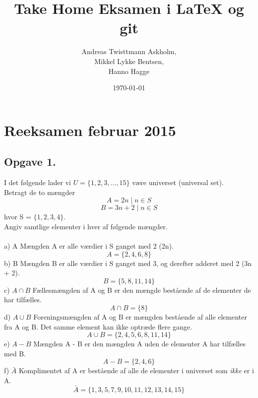 \documentclass[a4paper,12pt]{article}
\title{Take Home Eksamen i \LaTeX{} og git}
\author{Andreas Twisttmann Askholm, \\Mikkel Lykke Bentsen, \\Hanno Hagge}
\date{\today}
\begin{document}
\maketitle

\section{Reeksamen februar 2015}
\subsection{Opgave 1.}
I det følgende lader vi $U = \lbrace1, 2, 3, . . . , 15\rbrace$ være universet (universal set).\\
Betragt de to mængder\\
$$A = {2n \mid n \in S}$$
$$B = {3n + 2 \mid n \in S}$$
hvor S = $\lbrace1, 2, 3, 4\rbrace.$ \\
Angiv samtlige elementer i hver af følgende mængder.
\\\\
a) A  \hspace{5mm} Mængden A er alle værdier i  S ganget med 2 (2n).$$ A = \lbrace 2, 4, 6, 8\rbrace$$
b) B \hspace{5mm} Mængden B er alle værdier i S ganget med 3, og derefter adderet med 2 (3n + 2). $$ B = \lbrace 5, 8, 11, 14 \rbrace$$
c) $A \cap B$ \hspace{5mm} Fællesmængden af A og B er den mængde bestående af de elementer de har tilfælles. $$ A \cap B = \lbrace8\rbrace$$
d) $A \cup B$ \hspace{5mm} Foreningsmængden af A og B er mængden bestående af alle elementer fra A og B. Det samme element kan ikke optræde flere gange. $$ A \cup B = \lbrace 2, 4, 5, 6, 8, 11, 14\rbrace$$
e) $A - B$ \hspace{5mm} Mængden A - B er den mængden A uden de elementer A har tilfælles med B. $$ A - B = \lbrace 2, 4, 6 \rbrace $$
f) $ \bar{A}$ \hspace{5mm} Komplimentet af A er bestående af alle de elementer i universet som \emph{ikke} er i A. $$ \bar{A} = \lbrace 1, 3, 5, 7, 9, 10, 11, 12, 13, 14, 15 \rbrace$$
\end{document}
